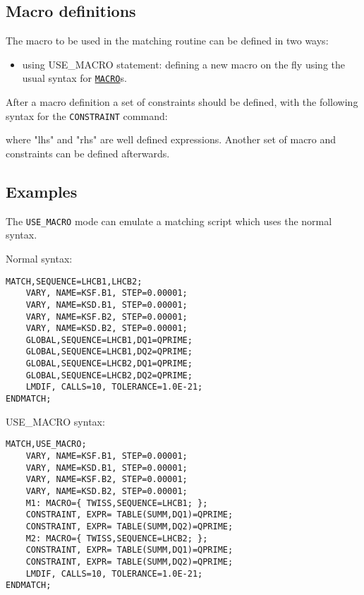\subsection{Macro definitions}
The macro to be used in the matching routine can be defined in two ways:
 
\begin{itemize}
\item using USE\_MACRO statement:
  defining a new macro on the fly using the usual syntax for
  \hyperref[sec:macro]{\texttt{MACRO}}s.  
\end{itemize}
 
After a macro definition a set of constraints should be defined, with
the following syntax for the \texttt{CONSTRAINT} command:
 

where "lhs" and "rhs" are well defined \madx expressions. 
Another set of macro and constraints can be defined afterwards. 

\subsection{Examples}
The \texttt{USE\_MACRO} mode can emulate a matching script
which uses the normal syntax. 

Normal syntax:
\begin{verbatim}
MATCH,SEQUENCE=LHCB1,LHCB2;
    VARY, NAME=KSF.B1, STEP=0.00001;
    VARY, NAME=KSD.B1, STEP=0.00001;
    VARY, NAME=KSF.B2, STEP=0.00001;
    VARY, NAME=KSD.B2, STEP=0.00001;
    GLOBAL,SEQUENCE=LHCB1,DQ1=QPRIME;
    GLOBAL,SEQUENCE=LHCB1,DQ2=QPRIME;
    GLOBAL,SEQUENCE=LHCB2,DQ1=QPRIME;
    GLOBAL,SEQUENCE=LHCB2,DQ2=QPRIME;
    LMDIF, CALLS=10, TOLERANCE=1.0E-21;
ENDMATCH;
\end{verbatim}

USE\_MACRO syntax:

\begin{verbatim}
MATCH,USE_MACRO;
    VARY, NAME=KSF.B1, STEP=0.00001;
    VARY, NAME=KSD.B1, STEP=0.00001;
    VARY, NAME=KSF.B2, STEP=0.00001;
    VARY, NAME=KSD.B2, STEP=0.00001;
    M1: MACRO={ TWISS,SEQUENCE=LHCB1; };
    CONSTRAINT, EXPR= TABLE(SUMM,DQ1)=QPRIME;
    CONSTRAINT, EXPR= TABLE(SUMM,DQ2)=QPRIME;
    M2: MACRO={ TWISS,SEQUENCE=LHCB2; };
    CONSTRAINT, EXPR= TABLE(SUMM,DQ1)=QPRIME;
    CONSTRAINT, EXPR= TABLE(SUMM,DQ2)=QPRIME;
    LMDIF, CALLS=10, TOLERANCE=1.0E-21;
ENDMATCH;
\end{verbatim}

